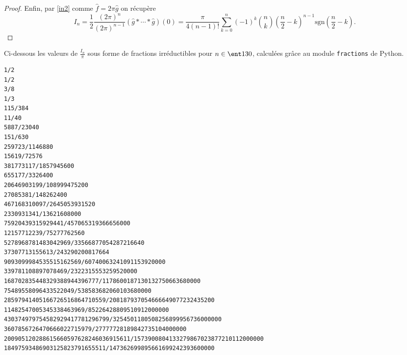 \documentclass{notes}
\begin{document}
\begin{proof}
  Enfin, par \eqref{in2} comme $\hat f = 2\pi \hat g$ on récupère 
  \[ I_n = \frac 12 \frac{(2\pi)^{n}}{(2\pi)^{n-1}} \left( \hat g\ast \cdots \ast \hat  g \right)(0)  =  \frac{\pi}{4(n-1)!}  \sum_{k=0}^{n} (-1)^{k}\binom nk \left( \frac n2 - k \right)^{n-1}\mathrm{sgn}\left( \frac n2 - k \right) .  \]


\end{proof}

Ci-dessous les valeurs de $\frac{I_n}{\pi}$ sous forme de fractions irréductibles pour $n\in \ent 1{30}$, calculées grâce au module \verb+fractions+ de Python.

\begin{lstlisting}
1/2
1/2
3/8
1/3
115/384
11/40
5887/23040
151/630
259723/1146880
15619/72576
381773117/1857945600
655177/3326400
20646903199/108999475200
27085381/148262400
467168310097/2645053931520
2330931341/13621608000
75920439315929441/457065319366656000
12157712239/75277762560
5278968781483042969/33566877054287216640
37307713155613/243290200817664
9093099984535515162569/60740063241091153920000
339781108897078469/2322315553259520000
168702835448329388944396777/1178600187130132750663680000
75489558096433522049/538583682060103680000
28597941405166726516864710559/208187937054666649077232435200
11482547005345338463969/85226428809510912000000
430374979754582929417781296799/3254501180508256899956736000000
3607856726470666022715979/27777728189842735104000000
200905120288615660597628246036915611/1573900804133279867023877210112000000
18497593486903125823791655511/147362699895661699242393600000
\end{lstlisting}



 
\end{document}

